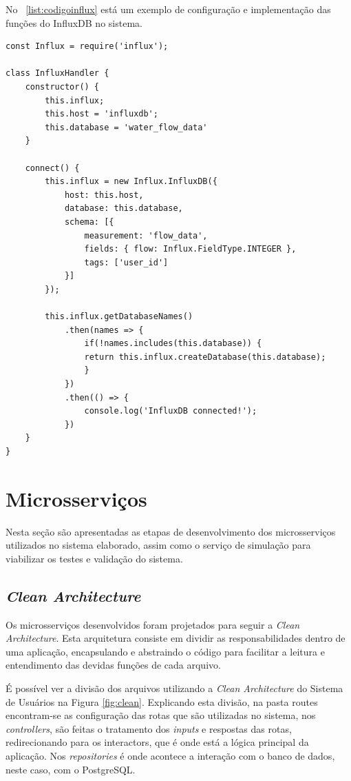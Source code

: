 No \lstlistingname\ \ref{list:codigoinflux} está um exemplo de configuração e implementação das funções do InfluxDB no sistema.

\newpage


\begin{lstlisting}[label=list:codigoinflux, caption=Exemplo do código de configuração do InfluxDB]
const Influx = require('influx');

class InfluxHandler {
	constructor() {
		this.influx;
		this.host = 'influxdb';
		this.database = 'water_flow_data'
	}
	
	connect() {
		this.influx = new Influx.InfluxDB({
			host: this.host,
			database: this.database,
			schema: [{
				measurement: 'flow_data',
				fields: { flow: Influx.FieldType.INTEGER },
				tags: ['user_id']
			}]
		});
		
		this.influx.getDatabaseNames()
			.then(names => {
				if(!names.includes(this.database)) {
				return this.influx.createDatabase(this.database);
				}
			})
			.then(() => {
				console.log('InfluxDB connected!');
			})
	}
}
\end{lstlisting}

\newpage

\section{Microsserviços}

Nesta seção são apresentadas as etapas de desenvolvimento dos microsserviços utilizados no sistema elaborado, assim como o serviço de simulação para viabilizar os testes e validação do sistema.

\subsection{\textit{Clean Architecture}}

Os microsserviços desenvolvidos foram projetados para seguir a \textit{Clean Architecture}. Esta arquitetura consiste em dividir as responsabilidades dentro de uma aplicação, encapsulando e abstraindo o código para facilitar a leitura e entendimento das devidas funções de cada arquivo.

É possível ver a divisão dos arquivos utilizando a \textit{Clean Architecture} do Sistema de Usuários na Figura \ref{fig:clean}. Explicando esta divisão, na pasta routes encontram-se as configuração das rotas que são utilizadas no sistema, nos \textit{controllers}, são feitas o tratamento dos \textit{inputs} e respostas das rotas, redirecionando para os interactors, que é onde está a lógica principal da aplicação. Nos \textit{repositories} é onde acontece a interação com o banco de dados, neste caso, com o PostgreSQL.

